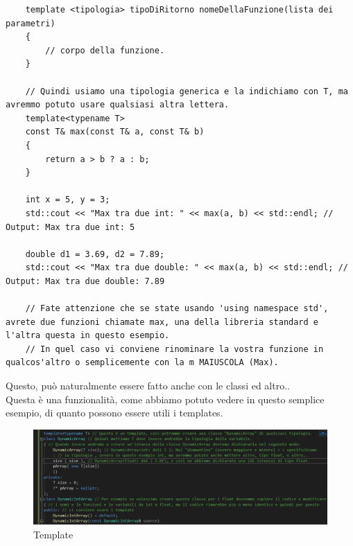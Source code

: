 \textsf{\small }

\begin{lstlisting}
	template <tipologia> tipoDiRitorno nomeDellaFunzione(lista dei parametri)
	{
		// corpo della funzione.
	}

	// Quindi usiamo una tipologia generica e la indichiamo con T, ma avremmo potuto usare qualsiasi altra lettera.
	template<typename T>
	const T& max(const T& a, const T& b)
	{
		return a > b ? a : b;
	}

	int x = 5, y = 3;
	std::cout << "Max tra due int: " << max(a, b) << std::endl; // Output: Max tra due int: 5
	
	double d1 = 3.69, d2 = 7.89;
	std::cout << "Max tra due double: " << max(a, b) << std::endl; // Output: Max tra due double: 7.89
	
	// Fate attenzione che se state usando 'using namespace std', avrete due funzioni chiamate max, una della libreria standard e l'altra questa in questo esempio.
	// In quel caso vi conviene rinominare la vostra funzione in qualcos'altro o semplicemente con la m MAIUSCOLA (Max).
\end{lstlisting}

\textsf{\small Questo, può naturalmente essere fatto anche con le classi ed altro..} \\

\textsf{\small Questa è una funzionalità, come abbiamo potuto vedere in questo semplice esempio, di quanto possono essere utili i templates.} \\

\begin{figure}[ht]
	\centering
	\includegraphics[width=1.2\textwidth, height=1.2\textheight, keepaspectratio]{./imgs/template.png}
	\caption{Template}
	\label{fig:template}
\end{figure}




